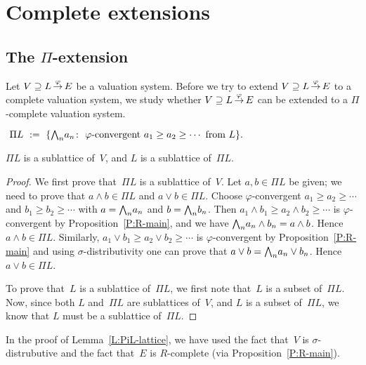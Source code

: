 \documentclass[main.tex]{subfiles}
\begin{document}
\section{Complete extensions}
%
%

\subsection{The $\Pi$-extension}
Let $V \supseteq L\,\smash{\stackrel{\varphi}{\rightarrow}}\,E$ be a valuation system.
Before we try to extend $V \supseteq L\,\smash{\stackrel{\varphi}{\rightarrow}}\,E$ to a complete
valuation system, 
we study whether $V \supseteq L\,\smash{\stackrel{\varphi}{\rightarrow}}\,E$
can be extended to a $\Pi$-complete valuation system.

\begin{dfn}
\label{D:PiL}
$\ \Pi L \ \eqdf \ \{ 
\bw_n a_n \colon \ \text{$\varphi$-convergent }
 a_1\geq a_2 \geq\dotsb \text{ from $L$} \}.$
\end{dfn}
%
%
\begin{lem}
\label{L:PiL-lattice}
$\Pi L$ is a sublattice of~$V$,
and $L$ is a sublattice of~$\Pi L$.
\end{lem}
\begin{proof}
We first prove that~$\Pi L$ is a sublattice of~$V$.
Let $a,b\in \Pi L$ be given;
we need to prove that $a\wedge b \in \Pi L$
and $a \vee b \in \Pi L$.
Choose $\varphi$-convergent 
$a_1 \geq a_2 \geq\dotsb$ and
$b_1 \geq b_2 \geq\dotsb$
with $a = \textstyle{\bigwedge}_n a_n$ and  $b=\textstyle{\bigwedge}_n b_n$.
Then $a_1 \wedge b_1 \geq a_2 \wedge b_2 \geq \dotsb$
is $\varphi$-convergent by Proposition~\ref{P:R-main},
and we have $\textstyle{\bigwedge}_n a_n \wedge b_n = a\wedge b$.
Hence $a\wedge b \in \Pi L$.
Similarly,
$a_1 \vee b_1 \geq a_2 \vee b_2 \geq \dotsb$
is $\varphi$-convergent by Proposition~\ref{P:R-main}
and
using $\sigma$-distributivity 
one can prove that $a \vee b  =\textstyle{\bigwedge}_n a_n \vee b_n$.
Hence $a\vee b \in \Pi L$.

To prove that~$L$ is a sublattice of~$\Pi L$,
we first note that~$L$ is a subset of~$\Pi L$.
Now,
since both $L$ and~$\Pi L$ are sublattices of~$V$,
and $L$ is a subset of~$\Pi L$,
we know that $L$ must be a sublattice of~$\Pi L$.
\end{proof}
\begin{rem}
In the proof of Lemma~\ref{L:PiL-lattice},
we have used the fact that~$V$ is $\sigma$-distrubutive
and the fact that~$E$ is $R$-complete
(via Proposition~\ref{P:R-main}).
\end{rem}
\end{document}
